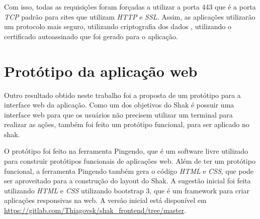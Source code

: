 Com isso, todas as requisições foram forçadas a utilizar a porta 443 que é a porta
\textit{TCP} padrão para sites que utilizam \textit{HTTP} e \textit{SSL}. Assim, 
as aplicações utilizarão um protocolo mais seguro, utilizando criptografia dos dados
, utilizando o certificado autoassinado que foi gerado para o aplicação.

\section{Protótipo da aplicação web}
\label{sub:prototipo}

Outro resultado obtido neste trabalho foi a proposta de um protótipo para a interface
web da aplicação. Como um dos objetivos do Shak é possuir uma interface web para que
os usuários não precisem utilizar um terminal para realizar as ações, também foi
feito um protótipo funcional, para ser aplicado no shak. 

O protótipo foi feito
na ferramenta Pingendo, que é um software livre utilizado para construir
protótipos funcionais de aplicações web. Além de ter um protótipo funcional, a 
ferramenta Pingendo
também gera o código \textit{HTML} e \textit{CSS}, que pode ser aproveitado para 
a construção do layout do Shak. A sugestão inicial foi feita utilizando \textit{HTML} e \textit{CSS} utilizando bootstrap 3, que é um framework para criar aplicações responsivas 
na web. A versão inicial está disponível em 
\url{https://gitlab.com/Thiagovsk/shak_frontend/tree/master}.


